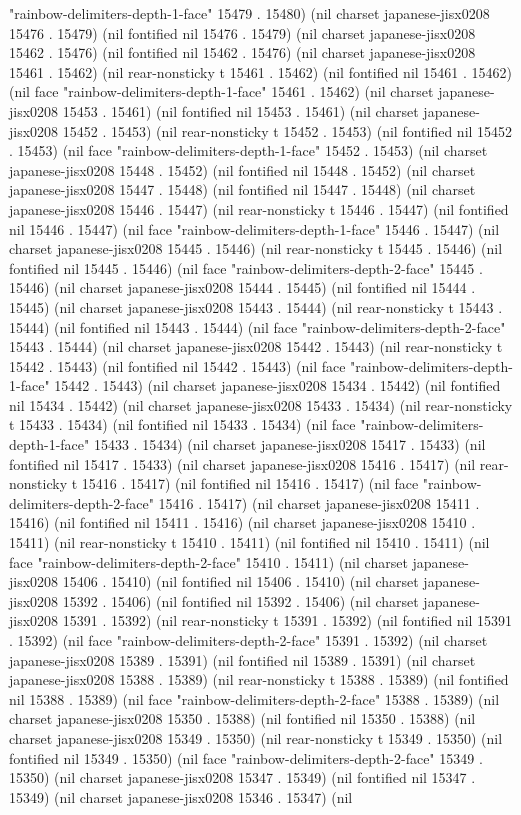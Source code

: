 "rainbow-delimiters-depth-1-face" 15479 . 15480) (nil charset japanese-jisx0208 15476 . 15479) (nil fontified nil 15476 . 15479) (nil charset japanese-jisx0208 15462 . 15476) (nil fontified nil 15462 . 15476) (nil charset japanese-jisx0208 15461 . 15462) (nil rear-nonsticky t 15461 . 15462) (nil fontified nil 15461 . 15462) (nil face "rainbow-delimiters-depth-1-face" 15461 . 15462) (nil charset japanese-jisx0208 15453 . 15461) (nil fontified nil 15453 . 15461) (nil charset japanese-jisx0208 15452 . 15453) (nil rear-nonsticky t 15452 . 15453) (nil fontified nil 15452 . 15453) (nil face "rainbow-delimiters-depth-1-face" 15452 . 15453) (nil charset japanese-jisx0208 15448 . 15452) (nil fontified nil 15448 . 15452) (nil charset japanese-jisx0208 15447 . 15448) (nil fontified nil 15447 . 15448) (nil charset japanese-jisx0208 15446 . 15447) (nil rear-nonsticky t 15446 . 15447) (nil fontified nil 15446 . 15447) (nil face "rainbow-delimiters-depth-1-face" 15446 . 15447) (nil charset japanese-jisx0208 15445 . 15446) (nil rear-nonsticky t 15445 . 15446) (nil fontified nil 15445 . 15446) (nil face "rainbow-delimiters-depth-2-face" 15445 . 15446) (nil charset japanese-jisx0208 15444 . 15445) (nil fontified nil 15444 . 15445) (nil charset japanese-jisx0208 15443 . 15444) (nil rear-nonsticky t 15443 . 15444) (nil fontified nil 15443 . 15444) (nil face "rainbow-delimiters-depth-2-face" 15443 . 15444) (nil charset japanese-jisx0208 15442 . 15443) (nil rear-nonsticky t 15442 . 15443) (nil fontified nil 15442 . 15443) (nil face "rainbow-delimiters-depth-1-face" 15442 . 15443) (nil charset japanese-jisx0208 15434 . 15442) (nil fontified nil 15434 . 15442) (nil charset japanese-jisx0208 15433 . 15434) (nil rear-nonsticky t 15433 . 15434) (nil fontified nil 15433 . 15434) (nil face "rainbow-delimiters-depth-1-face" 15433 . 15434) (nil charset japanese-jisx0208 15417 . 15433) (nil fontified nil 15417 . 15433) (nil charset japanese-jisx0208 15416 . 15417) (nil rear-nonsticky t 15416 . 15417) (nil fontified nil 15416 . 15417) (nil face "rainbow-delimiters-depth-2-face" 15416 . 15417) (nil charset japanese-jisx0208 15411 . 15416) (nil fontified nil 15411 . 15416) (nil charset japanese-jisx0208 15410 . 15411) (nil rear-nonsticky t 15410 . 15411) (nil fontified nil 15410 . 15411) (nil face "rainbow-delimiters-depth-2-face" 15410 . 15411) (nil charset japanese-jisx0208 15406 . 15410) (nil fontified nil 15406 . 15410) (nil charset japanese-jisx0208 15392 . 15406) (nil fontified nil 15392 . 15406) (nil charset japanese-jisx0208 15391 . 15392) (nil rear-nonsticky t 15391 . 15392) (nil fontified nil 15391 . 15392) (nil face "rainbow-delimiters-depth-2-face" 15391 . 15392) (nil charset japanese-jisx0208 15389 . 15391) (nil fontified nil 15389 . 15391) (nil charset japanese-jisx0208 15388 . 15389) (nil rear-nonsticky t 15388 . 15389) (nil fontified nil 15388 . 15389) (nil face "rainbow-delimiters-depth-2-face" 15388 . 15389) (nil charset japanese-jisx0208 15350 . 15388) (nil fontified nil 15350 . 15388) (nil charset japanese-jisx0208 15349 . 15350) (nil rear-nonsticky t 15349 . 15350) (nil fontified nil 15349 . 15350) (nil face "rainbow-delimiters-depth-2-face" 15349 . 15350) (nil charset japanese-jisx0208 15347 . 15349) (nil fontified nil 15347 . 15349) (nil charset japanese-jisx0208 15346 . 15347) (nil 